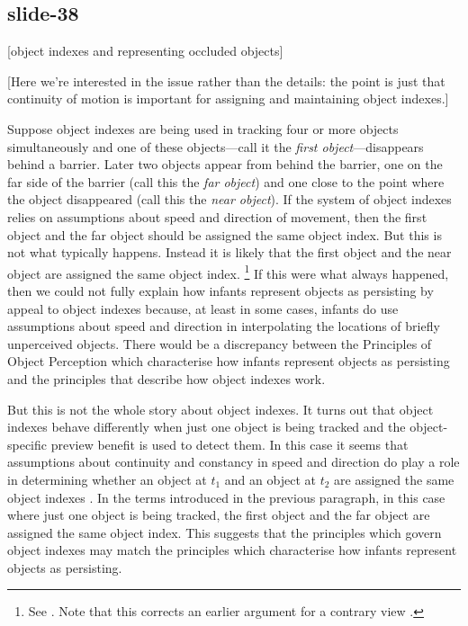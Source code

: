 \documentclass[12pt,\papersize]{extarticle}
\begin{document}
\subsection{slide-38}
[object indexes and representing occluded objects]

[Here we’re interested in the issue rather than the details: the point is just that
continuity of motion is important for assigning and maintaining object indexes.]

Suppose object indexes are being used in tracking four or more objects simultaneously and one of these objects—call it the \emph{first object}—disappears behind a barrier.
Later two objects appear from behind the barrier, one on the far side of the barrier (call this the \emph{far object}) and one close to the point where the object disappeared (call this the \emph{near object}).
If the system of object indexes relies on assumptions about speed and direction of movement, then the first object and the far object should be assigned the same object index.
But this is not what typically happens.
Instead it is likely that the first object and the near object are assigned the same object index.%
\footnote{
See \citet{franconeri:2012_simple}.  Note that this corrects an earlier argument for a contrary view \citep{scholl:1999_tracking}.
}
If this were what always happened, then we could not fully explain how infants represent objects as persisting by appeal to object indexes because, at least in some cases, infants do use assumptions about speed and direction in interpolating the locations of briefly unperceived objects.
There would be a discrepancy between the Principles of Object Perception which characterise how infants represent objects as persisting and the principles that describe how object indexes work.

But this is not the whole story about object indexes.
It turns out that object indexes behave differently when just one object is being tracked and the object-specific preview benefit is used to detect them.
In this case it seems that assumptions about continuity and constancy in speed and direction do play a role in determining whether an object at $t_1$ and an object at $t_2$ are assigned the same object indexes \citep{flombaum:2006_temporal,mitroff:2007_space}.
In the terms introduced in the previous paragraph, in this case where just one object is being tracked, the first object and the far object are assigned the same object index.
This suggests that the principles which govern object indexes may match the principles which characterise how infants represent objects as persisting.
\end{document}
